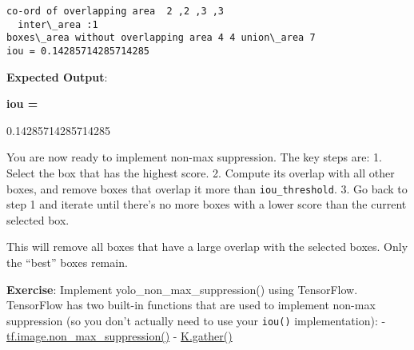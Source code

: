 \documentclass[11pt]{article}
\begin{document}
    \begin{Verbatim}[commandchars=\\\{\}]
co-ord of overlapping area  2 ,2 ,3 ,3 
  inter\_area :1
boxes\_area without overlapping area 4 4 union\_area 7
iou = 0.14285714285714285

    \end{Verbatim}

    \textbf{Expected Output}:

\textbf{iou = }

0.14285714285714285

    You are now ready to implement non-max suppression. The key steps are:
1. Select the box that has the highest score. 2. Compute its overlap
with all other boxes, and remove boxes that overlap it more than
\texttt{iou\_threshold}. 3. Go back to step 1 and iterate until there's
no more boxes with a lower score than the current selected box.

This will remove all boxes that have a large overlap with the selected
boxes. Only the ``best'' boxes remain.

\textbf{Exercise}: Implement yolo\_non\_max\_suppression() using
TensorFlow. TensorFlow has two built-in functions that are used to
implement non-max suppression (so you don't actually need to use your
\texttt{iou()} implementation): -
\href{https://www.tensorflow.org/api_docs/python/tf/image/non_max_suppression}{tf.image.non\_max\_suppression()}
-
\href{https://www.tensorflow.org/api_docs/python/tf/gather}{K.gather()}
\end{document}

